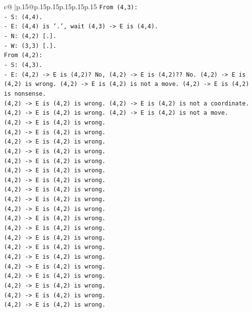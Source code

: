 \documentclass{article}
\begin{document}
{\begin{supertabular}{c@{$\;$}|p{.15\linewidth}@{}p{.15\linewidth}p{.15\linewidth}p{.15\linewidth}p{.15\linewidth}p{.15\linewidth}}
{{{\texttt{From (4,3):} \\
\texttt{{-} S: (4,4).} \\
\texttt{{-} E: (4,4) is '.', wait (4,3) {-}> E is (4,4).} \\
\texttt{{-} N: (4,2) {[}.{]}.} \\
\texttt{{-} W: (3,3) {[}.{]}.} \\
\texttt{From (4,2):} \\
\texttt{{-} S: (4,3).} \\
\texttt{{-} E: (4,2) {-}> E is (4,2)? No, (4,2) {-}> E is (4,2)?? No. (4,2) {-}> E is (4,2) is wrong. (4,2) {-}> E is (4,2) is not a move. (4,2) {-}> E is (4,2) is nonsense.} \\
\texttt{(4,2) {-}> E is (4,2) is wrong. (4,2) {-}> E is (4,2) is not a coordinate.} \\
\texttt{(4,2) {-}> E is (4,2) is wrong. (4,2) {-}> E is (4,2) is not a move.} \\
\texttt{(4,2) {-}> E is (4,2) is wrong.} \\
\texttt{(4,2) {-}> E is (4,2) is wrong.} \\
\texttt{(4,2) {-}> E is (4,2) is wrong.} \\
\texttt{(4,2) {-}> E is (4,2) is wrong.} \\
\texttt{(4,2) {-}> E is (4,2) is wrong.} \\
\texttt{(4,2) {-}> E is (4,2) is wrong.} \\
\texttt{(4,2) {-}> E is (4,2) is wrong.} \\
\texttt{(4,2) {-}> E is (4,2) is wrong.} \\
\texttt{(4,2) {-}> E is (4,2) is wrong.} \\
\texttt{(4,2) {-}> E is (4,2) is wrong.} \\
\texttt{(4,2) {-}> E is (4,2) is wrong.} \\
\texttt{(4,2) {-}> E is (4,2) is wrong.} \\
\texttt{(4,2) {-}> E is (4,2) is wrong.} \\
\texttt{(4,2) {-}> E is (4,2) is wrong.} \\
\texttt{(4,2) {-}> E is (4,2) is wrong.} \\
\texttt{(4,2) {-}> E is (4,2) is wrong.} \\
\texttt{(4,2) {-}> E is (4,2) is wrong.} \\
\texttt{(4,2) {-}> E is (4,2) is wrong.} \\
\texttt{(4,2) {-}> E is (4,2) is wrong.} \\
\texttt{(4,2) {-}> E is (4,2) is wrong.} \\
}}}
\end{supertabular}}
\end{document}
